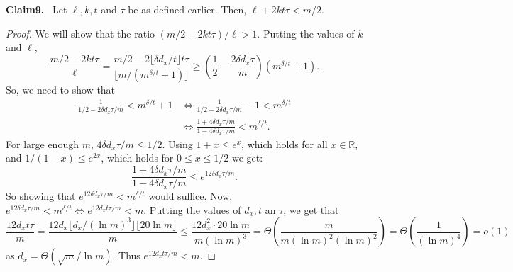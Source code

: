\documentclass[10pt,a4paper]{article}
\newenvironment{authorclaim}[1]{\par\medskip\noindent\textbf{#1.}\ \ignorespaces}{\par\medskip}
\begin{document}
\begin{authorclaim}{Claim9}
Let $\ell,k,t$ and $\tau$ be as defined earlier. Then, $\ell+2kt\tau<m/2$.
\end{authorclaim}
\begin{proof}
We will show that the ratio $(m/2-2kt\tau)/\ell>1$. Putting the values of $k$ and $\ell$,
\[
\frac{m/2-2kt\tau}{\ell}
=\frac{m/2-2\lfloor\delta d_x/t\rfloor t\tau}{\lfloor m/(m^{\delta/t}+1)\rfloor}
\ge\left(\frac12-\frac{2\delta d_x\tau}{m}\right)(m^{\delta/t}+1).
\]
So, we need to show that
\begin{align*}
\frac1{1/2-2\delta d_x\tau/m}<m^{\delta/t}+1
&\Longleftrightarrow\frac1{1/2-2\delta d_x\tau/m}-1<m^{\delta/t}\\
&\Longleftrightarrow\frac{1+4\delta d_x\tau/m}{1-4\delta d_x\tau/m}<m^{\delta/t}.
\end{align*}
For large enough $m$, $4\delta d_x\tau/m\le1/2$. Using $1+x\le e^x$, which holds for all $x\in\mathbb R$, and $1/(1-x)\le e^{2x}$, which holds for $0\le x\le1/2$ we get:
\[
\frac{1+4\delta d_x\tau/m}{1-4\delta d_x\tau/m}\le e^{12\delta d_x\tau/m}.
\]
So showing that $e^{12\delta d_x\tau/m}<m^{\delta/t}$ would suffice. Now,
$e^{12\delta d_x\tau/m}<m^{\delta/t}\Longleftrightarrow e^{12d_xt\tau/m}<m$.
Putting the values of $d_x,t$ an $\tau$, we get that
\[
\frac{12d_xt\tau}{m}
=\frac{12d_x\lfloor d_x/(\ln m)^3\rfloor\lfloor20\ln m\rfloor}{m}
\le\frac{12d_x^2\cdot20\ln m}{m(\ln m)^3}
=\Theta\left(\frac m{m(\ln m)^2(\ln m)^2}\right)
=\Theta\left(\frac1{(\ln m)^4}\right)=o(1)
\]
as $d_x=\Theta(\sqrt m/\ln m)$. Thus $e^{12d_xt\tau/m}<m$.
\end{proof}
\end{document}
